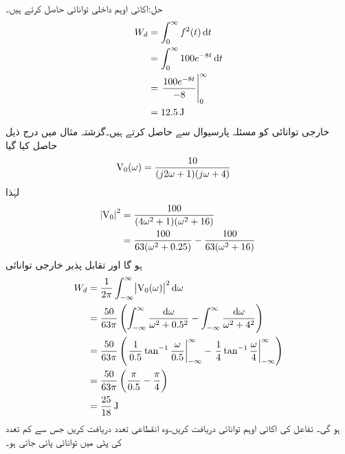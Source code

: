حل:اکائی اوہم داخلی توانائی حاصل کرتے ہیں۔
\begin{align*}
W_d&=\int_0^{\infty} f^2(t) \dif t\\
&=\int_0^{\infty} 100 e^{-8t} \dif t\\
&=\left. \frac{100e^{-8t}}{-8}\right|_{0}^{\infty}\\
&=\SI{12.5}{\joule}
\end{align*}
خارجی توانائی کو مسئلہ پارسیوال سے حاصل کرتے ہیں۔گزشتہ مثال میں درج ذیل حاصل کیا گیا
 \begin{align*}
{\ensuremath{{\textup{V}}}}_0(\omega)&=\frac{10}{(j2\omega+1)(j\omega+4)}
\end{align*}
لہٰذا
\begin{align*}
\abs{{{\textup{V}}}_0}^2&=\frac{100}{(4\omega^2+1)(\omega^2+16)}\\
&=\frac{100}{63(\omega^2+0.25)}-\frac{100}{63(\omega^2+16)}
\end{align*}
ہو گا اور تقابل پذیر خارجی توانائی
\begin{align*}
W_d&=\frac{1}{2\pi}\int_{-\infty}^{\infty}\abs{\bV_0(\omega)}^2 \dif \omega\\
&=\frac{50}{63\pi}\left(\int_{-\infty}^{\infty}\frac{\dif \omega}{\omega^2+0.5^2}-\int_{-\infty}^{\infty}\frac{\dif \omega}{\omega^2+4^2} \right)\\
&=\frac{50}{63\pi}\left(\left. \frac{1}{0.5}\tan^{-1} \frac{\omega}{0.5} \right|_{-\infty}^{\infty}-\left. \frac{1}{4}\tan^{-1} \frac{\omega}{4} \right|_{-\infty}^{\infty}\right)\\
&=\frac{50}{63\pi}\left(\frac{\pi}{0.5}-\frac{\pi}{4}\right)\\
&=\frac{25}{18}\,\si{\joule}
\end{align*}
ہو گی۔
تفاعل  کی اکائی اوہم توانائی دریافت کریں۔وہ  انقطاعی تعدد  دریافت کریں جس سے کم تعدد کی پٹی میں  توانائی پائی جاتی ہو۔

